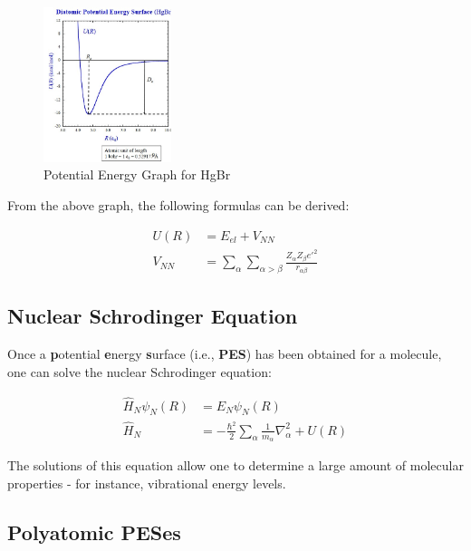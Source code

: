 \documentclass[
  letterpaper,
  DIV=11,
  numbers=noendperiod]{scrreprt}
\begin{document}
\begin{figure}

{\centering \includegraphics[width=1.47in,height=\textheight]{./images/wk2a/hgbr.jpg}

}

\caption{Potential Energy Graph for HgBr}

\end{figure}

From the above graph, the following formulas can be derived:

\begin{align}
  U(R) &= E_{el} + V_{NN} \\ 
  V_{NN} &= \sum_\alpha \sum_{\alpha > \beta}\frac{Z_\alpha Z_\beta e'^2}{r_{\alpha\beta}}
\end{align}

\hypertarget{nuclear-schrodinger-equation}{%
\subsection{Nuclear Schrodinger
Equation}\label{nuclear-schrodinger-equation}}

Once a \textbf{p}otential \textbf{e}nergy \textbf{s}urface (i.e.,
\textbf{PES}) has been obtained for a molecule, one can solve the
nuclear Schrodinger equation:

\begin{align}
  \hat{H}_N\psi_N(R) &= E_N\psi_N(R) \\ 
  \hat{H}_N &= -\frac{\hbar^2}{2}\sum_\alpha\frac{1}{m_\alpha}\nabla_\alpha^2 + U(R)
\end{align}

The solutions of this equation allow one to determine a large amount of
molecular properties - for instance, vibrational energy levels.

\hypertarget{polyatomic-peses}{%
\subsection{Polyatomic PESes}\label{polyatomic-peses}}
\end{document}
